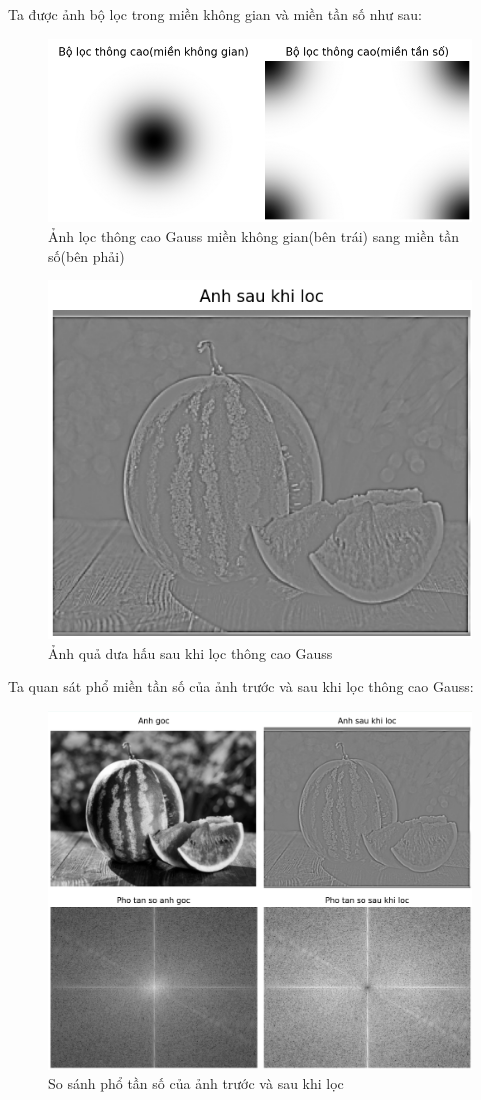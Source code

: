 \documentclass[12pt,a4paper]{report}
\numberwithin{equation}{section}
\theoremstyle{definition} %
\begin{document}
Ta được ảnh bộ lọc trong miền không gian và miền tần số như sau: 
\begin{figure}[H]
\centering
\includegraphics[width=0.8\linewidth]{img/GaussHP-KG-TS.png}
\caption{Ảnh lọc thông cao Gauss miền không gian(bên trái) sang miền tần số(bên phải)}
\end{figure}

\begin{figure}[H]
\centering
\includegraphics[width=0.6\linewidth]{img/SauLocGaussHP.png}
\caption{Ảnh quả dưa hấu sau khi lọc thông cao Gauss}
\end{figure}
Ta quan sát phổ miền tần số của ảnh trước và sau khi lọc thông cao Gauss: 
\begin{figure}[H]
\centering
\includegraphics[width=0.8\linewidth]{img/Hinh1-14.png}
\caption{So sánh phổ tần số của ảnh trước và sau khi lọc}
\end{figure}
\end{document}
